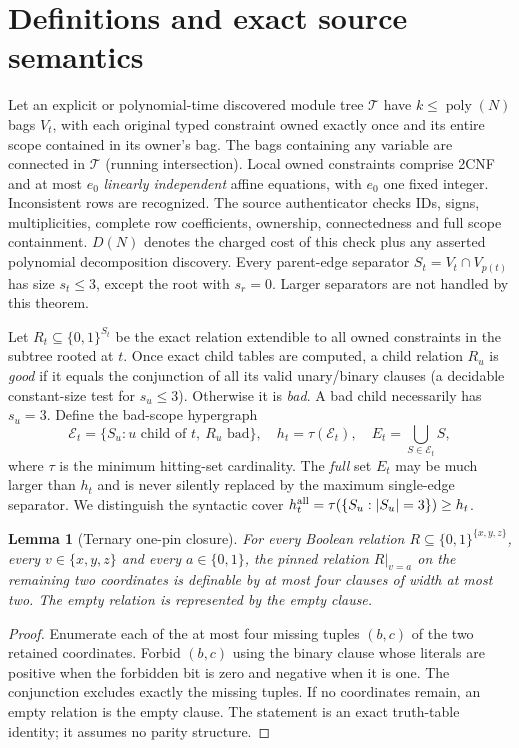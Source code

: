 \documentclass[10pt]{article}
\newtheorem{lemma}[theorem]{Lemma}
\newcommand{\poly}{\operatorname{poly}}
\begin{document}
\section{Definitions and exact source semantics}
Let an explicit or polynomial-time discovered module tree $\mathcal T$ have $k\le\poly(N)$ bags $V_t$, with each original typed constraint owned exactly once and its entire scope contained in its owner's bag. The bags containing any variable are connected in $\mathcal T$ (running intersection). Local owned constraints comprise 2CNF and at most $e_0$ \emph{linearly independent} affine equations, with $e_0$ one fixed integer. Inconsistent rows are recognized. The source authenticator checks IDs, signs, multiplicities, complete row coefficients, ownership, connectedness and full scope containment. $D(N)$ denotes the charged cost of this check plus any asserted polynomial decomposition discovery. Every parent-edge separator $S_t=V_t\cap V_{p(t)}$ has size $s_t\le3$, except the root with $s_r=0$. Larger separators are not handled by this theorem.

Let $R_t\subseteq\{0,1\}^{S_t}$ be the exact relation extendible to all owned constraints in the subtree rooted at $t$. Once exact child tables are computed, a child relation $R_u$ is \emph{good} if it equals the conjunction of all its valid unary/binary clauses (a decidable constant-size test for $s_u\le3$). Otherwise it is \emph{bad}. A bad child necessarily has $s_u=3$. Define the bad-scope hypergraph
\[
\mathcal E_t=\{S_u: u\text{ child of }t,\ R_u\text{ bad}\},\quad
h_t=\tau(\mathcal E_t),\quad
E_t=\bigcup_{S\in\mathcal E_t}S,
\]
where $\tau$ is the minimum hitting-set cardinality. The \emph{full} set $E_t$ may be much larger than $h_t$ and is never silently replaced by the maximum single-edge separator. We distinguish the syntactic cover $h_t^{\rm all}=\tau(\{S_u:|S_u|=3\})\ge h_t$.

\begin{lemma}[Ternary one-pin closure]\label{lem:pin}
For \emph{every} Boolean relation $R\subseteq\{0,1\}^{\{x,y,z\}}$, every $v\in\{x,y,z\}$ and every $a\in\{0,1\}$, the pinned relation $R|_{v=a}$ on the remaining two coordinates is definable by at most four clauses of width at most two. The empty relation is represented by the empty clause.
\end{lemma}
\begin{proof}
Enumerate each of the at most four missing tuples $(b,c)$ of the two retained coordinates. Forbid $(b,c)$ using the binary clause whose literals are positive when the forbidden bit is zero and negative when it is one. The conjunction excludes exactly the missing tuples. If no coordinates remain, an empty relation is the empty clause. The statement is an exact truth-table identity; it assumes no parity structure.\end{proof}
\end{document}
